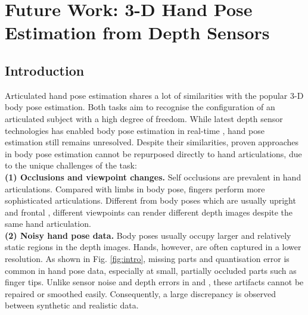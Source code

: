 \chapter{Future Work: 3-D Hand Pose Estimation from Depth Sensors}

\section{Introduction}
Articulated hand pose estimation shares a lot of similarities with the popular 3-D body pose estimation. 
Both tasks aim to recognise the configuration of an articulated subject with a high degree of freedom. 
While latest depth sensor technologies has enabled body pose estimation in real-time \cite{Baak_ICCV_11, Shotton_CVPR_11, Girshick_ICCV_11, Sun_CVPR_12}, hand pose estimation still remains unresolved.
Despite their similarities, proven approaches in body pose estimation cannot be repurposed directly to hand articulations, due to the unique challenges of the task:   \\
\textbf{(1) Occlusions and viewpoint changes.} Self occlusions are prevalent in hand articulations. %
Compared with limbs in body pose, fingers perform more sophisticated articulations. 
Different from body poses which are usually upright and frontal \cite{Eichner_IJCV_12}, different viewpoints can render different depth images despite the same hand articulation. \\  
\textbf{(2) Noisy hand pose data.} Body poses usually occupy larger and relatively static regions in the depth images. 
Hands, however, are often captured in a lower resolution.
As shown in Fig. \ref{fig:intro}, missing parts and quantisation error is common in hand pose data, especially at small, partially occluded parts such as finger tips. 
Unlike sensor noise and depth errors in \cite{Girshick_ICCV_11} and \cite{Baak_ICCV_11}, these artifacts cannot be repaired or smoothed easily. Consequently, a large discrepancy is observed between synthetic and realistic data. 

